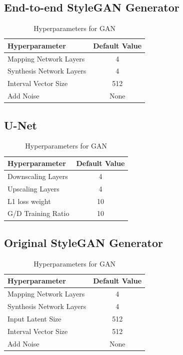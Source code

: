 \documentclass[letterpaper]{article}
\begin{document}
\subsection{End-to-end StyleGAN Generator}
\begin{table}[h]
    \centering
    \begin{tabular}{|l|c|}
        \hline
        Hyperparameter&Default Value\\
        \hline
        Mapping Network Layers&4\\
        Synthesis Network Layers&4\\
        Interval Vector Size&512\\
        Add Noise&None\\
        \hline
    \end{tabular}
    \caption{Hyperparameters for GAN}
\end{table}

\subsection{U-Net}
\begin{table}[h]
    \centering
    \begin{tabular}{|l|c|}
        \hline
        Hyperparameter&Default Value\\
        \hline
        Downscaling Layers&4\\
        Upscaling Layers&4\\
        L1 loss weight&10\\
        G/D Training Ratio&10\\
        \hline
    \end{tabular}
    \caption{Hyperparameters for GAN}
\end{table}

\subsection{Original StyleGAN Generator}
\begin{table}[h]
    \centering
    \begin{tabular}{|l|c|}
        \hline
        Hyperparameter&Default Value\\
        \hline
        Mapping Network Layers&4\\
        Synthesis Network Layers&4\\
        Input Latent Size&512\\
        Interval Vector Size&512\\
        Add Noise&None\\
        \hline
    \end{tabular}
    \caption{Hyperparameters for GAN}
\end{table}
\end{document}

